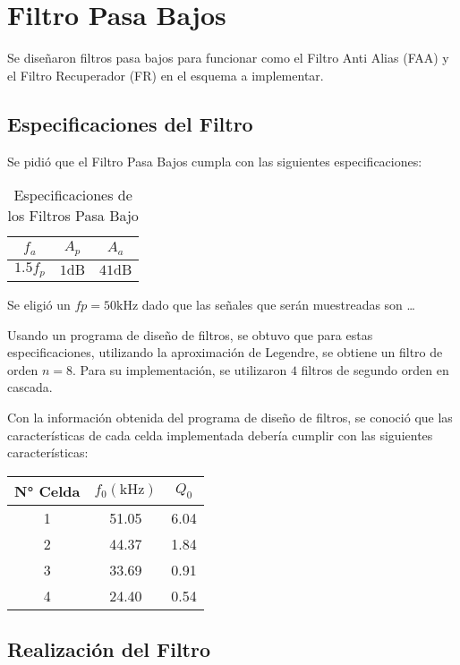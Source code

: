 \chapter{Filtro Pasa Bajos}
Se diseñaron filtros pasa bajos para funcionar como el Filtro Anti Alias (FAA) y el Filtro Recuperador (FR) en el esquema a implementar.
\section{Especificaciones del Filtro}
Se pidió que el Filtro Pasa Bajos cumpla con las siguientes especificaciones:

\begin{table}[ht]
    \centering
    \begin{tabular}{|c|c|c|}
        \hline
        $f_a$  &   $A_p$   &   $A_a$    \\
        \hline
        $1.5 f_p$   &   $1 \si{\deci\bel}$ &   $41 \si{\deci\bel}$    \\
        \hline
    \end{tabular}
    \caption{Especificaciones de los Filtros Pasa Bajo}
\end{table}

Se eligió un $fp = 50 \si{\kilo\hertz}$ dado que las señales que serán muestreadas son \dots

Usando un programa de diseño de filtros, se obtuvo que para estas especificaciones, utilizando la aproximación de Legendre, se obtiene un filtro de orden $n=8$. Para su implementación, se utilizaron $4$ filtros de segundo orden en cascada.

Con la información obtenida del programa de diseño de filtros, se conoció que las características de cada celda implementada debería cumplir con las siguientes características:

\begin{table}[ht]
    \centering
    \begin{tabular}{|c|c|c|}
        \hline
        N° Celda    & $f_0(\si{\kilo\hertz})$ & $Q_0$ \\
        \hline
        1   & 51.05 & 6.04  \\
        2   & 44.37 & 1.84  \\
        3   & 33.69 & 0.91  \\
        4   & 24.40 & 0.54  \\
        \hline
    \end{tabular}
\end{table}

\section{Realización del Filtro}

